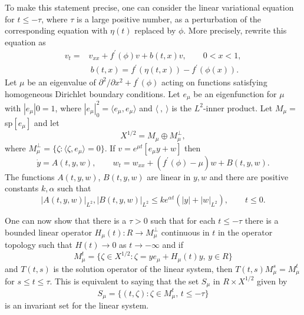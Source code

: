 \documentclass{surv-l}
\theoremstyle{plain}
\theoremstyle{definition}
\numberwithin{equation}{section}
\numberwithin{figure}{chapter}
\begin{document}
To make this statement precise, one can consider the linear variational equation for $ t\leq-\tau$, where $\tau$ is a large positive number, as a perturbation of the corresponding equation with $\eta(t)$ replaced by $\phi$. More precisely, rewrite this equation as
\begin{align*}
v_{t}=&v_{xx}+f^{\prime}(\phi)v+b(t, x)v,\qquad 0<x<1,\\
&\ b(t, x)=f^{\prime}(\eta(t, x))-f^{\prime}(\phi(x)).
\end{align*}
Let $\mu$ be an eigenvalue of $\partial^{2}/\partial x^{2}+f^{\prime}(\phi)$ acting on functions satisfying homogeneous Dirichlet boundary conditions. Let $e_{\mu}$ be an eigenfunction for $\mu$ with $|e_{\mu}|0=1$, where $|e_{\mu}|_{0}^{2}=\langle e_{\mu}, e_{\mu}\rangle$ and $\langle\ {,}\ \rangle$ is the $L^{2}$-inner product. Let $M_{\mu}=$ sp$[e_{\mu}]$ and let
\begin{equation*}
X^{1/2}=M_{\mu}\oplus M_{\mu}^{\perp},
\end{equation*}
where $M_{\mu}^{\perp}=\{\zeta\!:\langle\zeta, e_{\mu}\rangle=0\}$. If $v=e^{\mu t}[e_{\mu}y+w]$ then
\begin{equation*}
\dot{y}=A(t, y, w),\qquad w_{t}=w_{xx}+(f^{\prime}(\phi)-\mu)w+B(t, y, w).
\end{equation*}
The functions $A(t, y, w)$, $B(t, y, w)$ are linear in $y,w$ and there are positive constants $k, \alpha$ such that
\begin{equation*}
|A(t, y, w)|_{L^{2}}, |B(t, y, w)|_{L^{2}}\leq ke^{\alpha t}(|y|+|w|_{L^{2}}),\qquad t\leq 0.
\end{equation*}

One can now show that there is a $\tau >0$ such that for each $ t\leq-\tau$ there is a bounded linear operator $H_{\mu}(t)\!:R\rightarrow M_{\mu}^{\perp}$ continuous in $t$ in the operator topology such that $H(t)\rightarrow 0$ as $ t\rightarrow-\infty$ and if
\begin{equation*}
M_{\mu}^{t}=\{\zeta\in X^{1/2}:\zeta=ye_{\mu}+H_{\mu}(t)y,\, y\in R\}
\end{equation*}
and $T(t, s)$ is the solution operator of the linear system, then $T(t, s)M_{\mu}^{s}=M_{\mu}^{t}$ for $ s\leq t\leq\tau$. This is equivalent to saying that the set $S_{\mu}$ in $R\times X^{1/2}$ given by
\begin{equation*}
S_{\mu}=\{(t, \zeta)\!:\zeta\in M_{\mu}^{t},\, t\leq-\tau\}
\end{equation*}
is an invariant set for the linear system.
\end{document}
